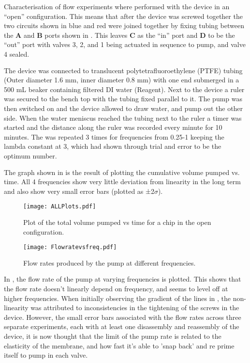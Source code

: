 Characterisation of flow experiments where performed with the device in an “open”
configuration. This means that after the device was screwed together the two circuits shown
in blue and red were joined together by fixing tubing between the \textbf{A} and \textbf{B} ports shown in
. This leaves \textbf{C} as the “in” port and \textbf{D} to be the “out” port with valves 3, 2, and 1
being actuated in sequence to pump, and valve 4 sealed.

The device was connected to translucent polytetrafluoroethylene (PTFE) tubing (Outer
diameter 1.6 mm, inner diameter 0.8 mm) with one end submerged in a 500 mL beaker
containing filtered DI water (Reagent). Next to the device a ruler was secured to the bench
top with the tubing fixed parallel to it. The pump was then switched on and the device
allowed to draw water, and pump out the other side. When the water meniscus reached the tubing
next to the ruler a timer was started and the distance along the ruler was recorded every
minute for 10 minutes. The was repeated 3 times for frequencies from 0.25-1 keeping the
lambda constant at 3, which had shown through trial and error to be the optimum number.

The graph shown in  is the result of plotting the cumulative volume pumped
vs. time. All 4 frequencies show very little deviation from linearity in the
long term and also show very small error bars (plotted as ±2$\sigma$).

\begin{figure}[ht]
  \begin{center}
  \texttt{[image: ALLPlots.pdf]}
  \caption{Plot of the total volume pumped vs time for a chip in the open
  configuration.}
  \label{fig:Graph}
  \end{center}
\end{figure}

\begin{figure}[ht]
  \begin{center}
  \texttt{[image: Flowratevsfreq.pdf]}
  \caption{Flow rates produced by the pump at different frequencies.}
  \label{fig:FRvFGraph}
  \end{center}
\end{figure}

In , the flow rate of the pump at varying frequencies is plotted. This
shows that the flow rate doesn't linearly depend on frequency, and seems to level off at higher
frequencies. When initially observing the gradient of the lines in , the non-
linearity was attributed to inconsistencies in the tightening of the screws in the device.
However, the small error bars associated with the flow rates across three separate
experiments, each with at least one disassembly and reassembly of the device, it is now thought that the limit of the
pump rate is related to the elasticity of the membrane, and how fast it's able to 'snap
back' and re prime itself to pump in each valve.

